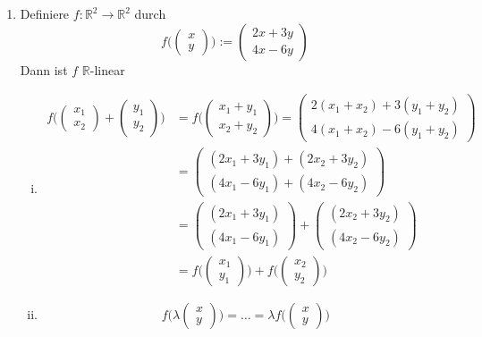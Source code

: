 \begin{enumerate}[(1)]
\begin{enumerate}[i)]
\end{enumerate}

\item Definiere $f: \mathds{R}^2 \to \mathds{R}^2 $ durch
\[
f \Bigg(\begin{pmatrix} x \\ y \end{pmatrix}\Bigg) := \begin{pmatrix} 2x +3y  \\ 4x -6y  \end{pmatrix} 
\]
Dann ist $f$ $\mathds{R}$-linear

\begin{enumerate}[i)]
\item 
\begin{align*}
f \Bigg( \begin{pmatrix} x_1 \\ x_2 \end{pmatrix} + \begin{pmatrix} y_1 \\ y_2 \end{pmatrix}\Bigg)
&= f \Bigg( \begin{pmatrix} x_1 + y_1 \\ x_2 + y_2\end{pmatrix} \Bigg)
= \begin{pmatrix} 2(x_1 + x_2) +3(y_1 + y_2)  \\ 4(x_1  + x_2) -6(y_1 + y_2)  \end{pmatrix} \\
&= \begin{pmatrix} (2x_1 + 3y_1) +(2x_2 + 3y_2)  \\ (4x_1  - 6y_1) +(4x_2 - 6y_2)  \end{pmatrix} \\
&= \begin{pmatrix} (2x_1 + 3y_1)  \\ (4x_1  - 6y_1)  \end{pmatrix} + \begin{pmatrix} (2x_2 + 3y_2)  \\ (4x_2 - 6y_2)\end{pmatrix} \\
&= f \Bigg( \begin{pmatrix} x_1 \\ y_1 \end{pmatrix}\Bigg) + f \Bigg( \begin{pmatrix} x_2 \\ y_2 \end{pmatrix}\Bigg)
\end{align*}

\item 
\[
f\Bigg( \lambda \begin{pmatrix} x \\ y \end{pmatrix} \Bigg) 
= \ldots 
= \lambda f\Bigg( \begin{pmatrix} x \\ y \end{pmatrix} \Bigg)
\]
\end{enumerate}

\end{enumerate}

